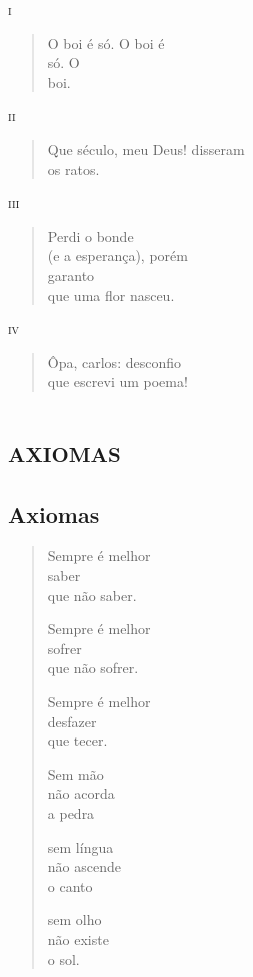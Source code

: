 \forceindent\textsc{i}

\begin{verse}
O boi é só. O boi é\\
só. O\\
boi.
\end{verse}

\medskip
\textsc{ii}

\begin{verse}
Que século, meu Deus! disseram\\
os ratos.
\end{verse}

\medskip
\textsc{iii}

\begin{verse}
Perdi o bonde\\
(e a esperança), porém\\
garanto\\
que uma flor nasceu.
\end{verse}

\medskip
\textsc{iv}

\begin{verse}
Ôpa, carlos: desconfio\\
que escrevi um poema!
\end{verse}

\part*{\textsc{axiomas}}

\chapter{Axiomas}

\begin{verse}
Sempre é melhor\\
saber\\
\qquad que não saber.

\qquad Sempre é melhor\\
\qquad sofrer\\
\qquad que não sofrer.

\qquad Sempre é melhor\\
\qquad desfazer\\
\qquad que tecer.

\qquad Sem mão\\
\qquad não acorda\\
\qquad a pedra

\qquad sem língua\\
\qquad não ascende\\
\qquad o canto

\qquad sem olho\\
\qquad não existe\\
\qquad o sol.
\end{verse}

